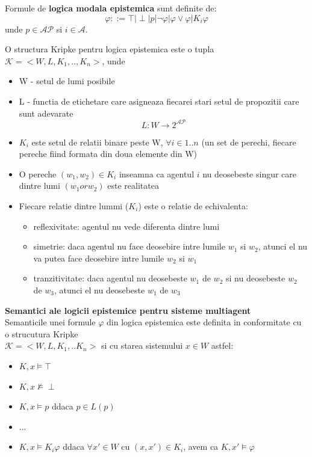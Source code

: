 \documentclass[10pt,a4paper,twocolumn]{report}
\begin{document}
Formule de \textbf{logica modala epistemica} sunt definite de:
\[\varphi ::= \top | \perp | p | \neg \varphi | \varphi \vee \varphi | K_i\varphi\] unde $p \in \mathcal{AP}$ si $i \in \mathcal{A}$.


O structura Kripke pentru logica epistemica este o tupla $\mathcal{K} = <W, L, K_1, .., K_n>$, unde

\begin{itemize}
\item W - setul de lumi posibile
\item L - functia de etichetare care asigneaza fiecarei stari setul de propozitii care sunt adevarate
\[L:W\rightarrow 2^\mathcal{AP}\]
\item $K_i$ este setul de relatii binare peste W, $\forall i \in 1..n$ (un set de perechi, fiecare pereche fiind formata din doua elemente din W)
\item O pereche $(w_1,w_2) \in K_i$ inseamna ca agentul $i$ nu deosebeste singur care dintre lumi $(w_1 \mathit{ or } w_2)$ este realitatea
\item Fiecare relatie dintre lummi ($K_i$) este o relatie de echivalenta:
	\begin{itemize}
	\item reflexivitate: agentul nu vede diferenta dintre lumi
	\item simetrie: daca agentul nu face deosebire intre lumile $w_1$ si $w_2$, atunci el nu va putea face deosebire intre lumile $w_2$ si $w_1$
	\item tranzitivitate: daca agentul nu deosebeste $w_1$ de $w_2$ si nu deosebeste $w_2$ de $w_3$, atunci el nu deosebeste $w_1$ de $w_3$
	\end{itemize}
\end{itemize}

\textbf{Semantici ale logicii epistemice pentru sisteme multiagent}\\
Semanticile unei formule $\varphi$ din logica epistemica este definita in conformitate cu o strucutura Kripke\\$\mathcal{K} = <W, L, K_1, .. K_n>$ si cu starea sistemului $x \in W$ astfel:
\begin{itemize}
\item $K,x \models \top$
\item $K,x \not \models \perp$
\item $K,x \models p$ ddaca $p \in L(p)$
\item ...
\item $K,x \models K_i\varphi$ ddaca $\forall x' \in W$ cu $(x, x') \in K_i $, avem ca $K,x' \models \varphi$
\end{itemize}
\end{document}

